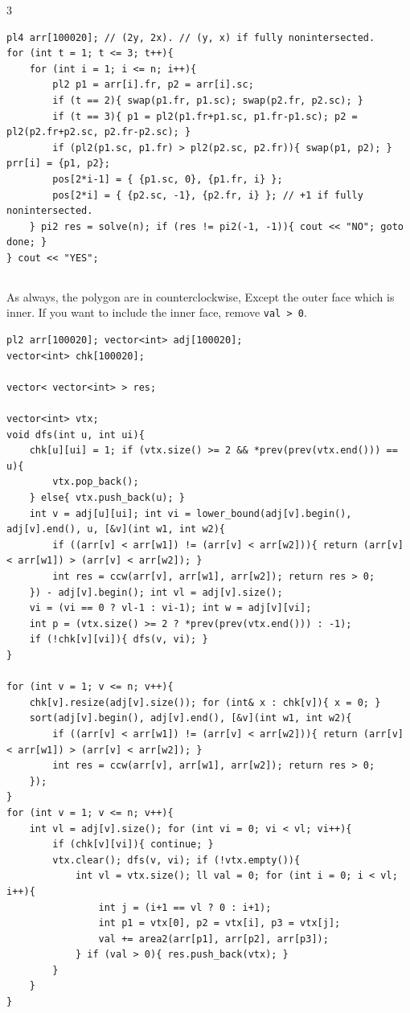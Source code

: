 \documentclass[landscape, 8pt, a4paper, oneside]{extarticle}
\begin{document}
\begin{multicols*}{3}
\begin{verbatim}
pl4 arr[100020]; // (2y, 2x). // (y, x) if fully nonintersected.
for (int t = 1; t <= 3; t++){
	for (int i = 1; i <= n; i++){
		pl2 p1 = arr[i].fr, p2 = arr[i].sc;
		if (t == 2){ swap(p1.fr, p1.sc); swap(p2.fr, p2.sc); }
		if (t == 3){ p1 = pl2(p1.fr+p1.sc, p1.fr-p1.sc); p2 = pl2(p2.fr+p2.sc, p2.fr-p2.sc); }
		if (pl2(p1.sc, p1.fr) > pl2(p2.sc, p2.fr)){ swap(p1, p2); } prr[i] = {p1, p2};
		pos[2*i-1] = { {p1.sc, 0}, {p1.fr, i} };
		pos[2*i] = { {p2.sc, -1}, {p2.fr, i} }; // +1 if fully nonintersected.
	} pi2 res = solve(n); if (res != pi2(-1, -1)){ cout << "NO"; goto done; }
} cout << "YES";
\end{verbatim}
\subsection{}
As always, the polygon are in counterclockwise, Except the outer face which is inner.
If you want to include the inner face, remove \texttt{val > 0}.
\begin{verbatim}
pl2 arr[100020]; vector<int> adj[100020];
vector<int> chk[100020];

vector< vector<int> > res;

vector<int> vtx;
void dfs(int u, int ui){
	chk[u][ui] = 1; if (vtx.size() >= 2 && *prev(prev(vtx.end())) == u){
		vtx.pop_back();
	} else{ vtx.push_back(u); }
	int v = adj[u][ui]; int vi = lower_bound(adj[v].begin(), adj[v].end(), u, [&v](int w1, int w2){
		if ((arr[v] < arr[w1]) != (arr[v] < arr[w2])){ return (arr[v] < arr[w1]) > (arr[v] < arr[w2]); }
		int res = ccw(arr[v], arr[w1], arr[w2]); return res > 0;
	}) - adj[v].begin(); int vl = adj[v].size();
	vi = (vi == 0 ? vl-1 : vi-1); int w = adj[v][vi];
	int p = (vtx.size() >= 2 ? *prev(prev(vtx.end())) : -1);
	if (!chk[v][vi]){ dfs(v, vi); }
}

for (int v = 1; v <= n; v++){
	chk[v].resize(adj[v].size()); for (int& x : chk[v]){ x = 0; }
	sort(adj[v].begin(), adj[v].end(), [&v](int w1, int w2){
		if ((arr[v] < arr[w1]) != (arr[v] < arr[w2])){ return (arr[v] < arr[w1]) > (arr[v] < arr[w2]); }
		int res = ccw(arr[v], arr[w1], arr[w2]); return res > 0;
	});
}
for (int v = 1; v <= n; v++){
	int vl = adj[v].size(); for (int vi = 0; vi < vl; vi++){
		if (chk[v][vi]){ continue; }
		vtx.clear(); dfs(v, vi); if (!vtx.empty()){
			int vl = vtx.size(); ll val = 0; for (int i = 0; i < vl; i++){
				int j = (i+1 == vl ? 0 : i+1);
				int p1 = vtx[0], p2 = vtx[i], p3 = vtx[j];
				val += area2(arr[p1], arr[p2], arr[p3]);
			} if (val > 0){ res.push_back(vtx); }
		}
	}
}
\end{verbatim}

\end{multicols*}
\end{document}
